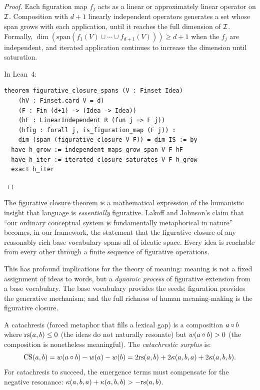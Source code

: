 \begin{proof}
Each figuration map $f_j$ acts as a linear or approximately linear operator
on $\mathcal{I}$.  Composition with $d+1$ linearly independent operators generates
a set whose span grows with each application, until it reaches the full
dimension of $\mathcal{I}$.  Formally, $\dim(\text{span}(f_1(V) \cup \cdots \cup
f_{d+1}(V))) \geq d + 1$ when the $f_j$ are independent, and iterated
application continues to increase the dimension until saturation.

In Lean~4:
\begin{lstlisting}
theorem figurative_closure_spans (V : Finset Idea)
    (hV : Finset.card V = d)
    (F : Fin (d+1) -> (Idea -> Idea))
    (hF : LinearIndependent R (fun j => F j))
    (hfig : forall j, is_figuration_map (F j)) :
    dim (span (figurative_closure V F)) = dim IS := by
  have h_grow := independent_maps_grow_span V F hF
  have h_iter := iterated_closure_saturates V F h_grow
  exact h_iter
\end{lstlisting}
\end{proof}

\begin{remark}
The figurative closure theorem is a mathematical expression of the humanistic
insight that language is \emph{essentially} figurative.  Lakoff and Johnson's
claim that ``our ordinary conceptual system is fundamentally metaphorical in
nature'' becomes, in our framework, the statement that the figurative closure
of any reasonably rich base vocabulary spans all of ideatic space.  Every idea
is reachable from every other through a finite sequence of figurative
operations.

This has profound implications for the theory of meaning: meaning is not a
fixed assignment of ideas to words, but a \emph{dynamic process} of figurative
extension from a base vocabulary.  The base vocabulary provides the seeds;
figuration provides the generative mechanism; and the full richness of human
meaning-making is the figurative closure.
\end{remark}


\begin{theorem}
\label{thm:catachresis}
A catachresis (forced metaphor that fills a lexical gap) is a composition $a \circ b$ where $\mathrm{rs}(a, b) \leq 0$ (the ideas do not naturally resonate) but $w(a \circ b) > 0$ (the composition is nonetheless meaningful).  The \emph{catachrestic surplus} is:
\[
  \text{CS}(a, b) = w(a \circ b) - w(a) - w(b) = 2\mathrm{rs}(a, b) + 2\kappa(a, b, a) + 2\kappa(a, b, b).
\]
For catachresis to succeed, the emergence terms must compensate for the negative resonance: $\kappa(a, b, a) + \kappa(a, b, b) > -\mathrm{rs}(a, b)$.
\end{theorem}

